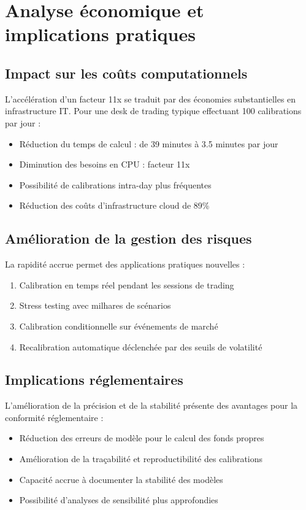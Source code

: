 \section{Analyse économique et implications pratiques}

\subsection{Impact sur les coûts computationnels}

L'accélération d'un facteur 11x se traduit par des économies substantielles en infrastructure IT. Pour une desk de trading typique effectuant 100 calibrations par jour :

\begin{itemize}
\item Réduction du temps de calcul : de 39 minutes à 3.5 minutes par jour
\item Diminution des besoins en CPU : facteur 11x
\item Possibilité de calibrations intra-day plus fréquentes
\item Réduction des coûts d'infrastructure cloud de 89\%
\end{itemize}

\subsection{Amélioration de la gestion des risques}

La rapidité accrue permet des applications pratiques nouvelles :

\begin{enumerate}
\item Calibration en temps réel pendant les sessions de trading
\item Stress testing avec milhares de scénarios
\item Calibration conditionnelle sur événements de marché
\item Recalibration automatique déclenchée par des seuils de volatilité
\end{enumerate}

\subsection{Implications réglementaires}

L'amélioration de la précision et de la stabilité présente des avantages pour la conformité réglementaire :

\begin{itemize}
\item Réduction des erreurs de modèle pour le calcul des fonds propres
\item Amélioration de la traçabilité et reproductibilité des calibrations
\item Capacité accrue à documenter la stabilité des modèles
\item Possibilité d'analyses de sensibilité plus approfondies
\end{itemize}

